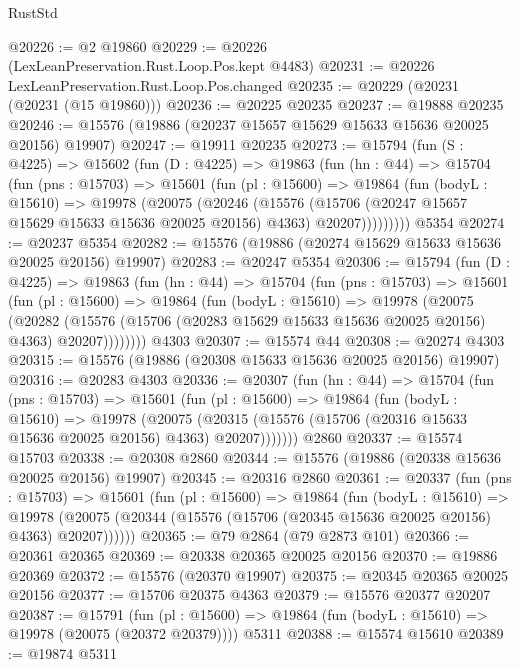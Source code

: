 \begin{lexlean}{RustStd}
\begin{coremodule}
@20226 := @2 @19860
@20229 := @20226 (LexLeanPreservation.Rust.Loop.Pos.kept @4483)
@20231 := @20226 LexLeanPreservation.Rust.Loop.Pos.changed
@20235 := @20229 (@20231 (@20231 (@15 @19860)))
@20236 := @20225 @20235
@20237 := @19888 @20235
@20246 := @15576 (@19886 (@20237 @15657 @15629 @15633 @15636 @20025 @20156) @19907)
@20247 := @19911 @20235
@20273 := @15794
    (fun (S : @4225) =>
    @15602
      (fun (D : @4225) =>
      @19863
        (fun (hn : @44) =>
        @15704
          (fun (pns : @15703) =>
          @15601
            (fun (pl : @15600) =>
            @19864
              (fun (bodyL : @15610) =>
              @19978
                (@20075
                  (@20246
                    (@15576
                      (@15706 (@20247 @15657 @15629 @15633 @15636 @20025 @20156) @4363)
                      @20207)))))))))
    @5354
@20274 := @20237 @5354
@20282 := @15576 (@19886 (@20274 @15629 @15633 @15636 @20025 @20156) @19907)
@20283 := @20247 @5354
@20306 := @15794
    (fun (D : @4225) =>
    @19863
      (fun (hn : @44) =>
      @15704
        (fun (pns : @15703) =>
        @15601
          (fun (pl : @15600) =>
          @19864
            (fun (bodyL : @15610) =>
            @19978
              (@20075
                (@20282
                  (@15576 (@15706 (@20283 @15629 @15633 @15636 @20025 @20156) @4363) @20207))))))))
    @4303
@20307 := @15574 @44
@20308 := @20274 @4303
@20315 := @15576 (@19886 (@20308 @15633 @15636 @20025 @20156) @19907)
@20316 := @20283 @4303
@20336 := @20307
    (fun (hn : @44) =>
    @15704
      (fun (pns : @15703) =>
      @15601
        (fun (pl : @15600) =>
        @19864
          (fun (bodyL : @15610) =>
          @19978
            (@20075
              (@20315 (@15576 (@15706 (@20316 @15633 @15636 @20025 @20156) @4363) @20207)))))))
    @2860
@20337 := @15574 @15703
@20338 := @20308 @2860
@20344 := @15576 (@19886 (@20338 @15636 @20025 @20156) @19907)
@20345 := @20316 @2860
@20361 := @20337
    (fun (pns : @15703) =>
    @15601
      (fun (pl : @15600) =>
      @19864
        (fun (bodyL : @15610) =>
        @19978 (@20075 (@20344 (@15576 (@15706 (@20345 @15636 @20025 @20156) @4363) @20207))))))
@20365 := @79 @2864 (@79 @2873 @101)
@20366 := @20361 @20365
@20369 := @20338 @20365 @20025 @20156
@20370 := @19886 @20369
@20372 := @15576 (@20370 @19907)
@20375 := @20345 @20365 @20025 @20156
@20377 := @15706 @20375 @4363
@20379 := @15576 @20377 @20207
@20387 := @15791
    (fun (pl : @15600) => @19864 (fun (bodyL : @15610) => @19978 (@20075 (@20372 @20379))))
    @5311
@20388 := @15574 @15610
@20389 := @19874 @5311

\end{coremodule}
\end{lexlean}
